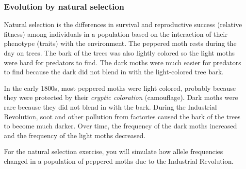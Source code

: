 \documentclass[12pt, hidelinks]{exam}
\begin{document}
%  
%  
%
%
\subsubsection*{Evolution by natural selection}\label{sec:natural_selection}

Natural selection is the differences in survival and reproductive success (relative fitness) among individuals in a population based on the interaction of their phenotype (traits) with the environment. The peppered moth rests during the day on trees. The bark of the trees was also lightly colored so the light moths were hard for predators to find. The dark moths were much easier for predators to find because the dark did not blend in with the light-colored tree bark. 

In the early 1800s, most peppered moths were light colored, probably because they were protected by their \emph{cryptic coloration} (camouflage). Dark moths were rare because they did not blend in with the bark. During the Industrial Revolution, soot and other pollution from factories caused the bark of the trees to become much darker. Over time, the frequency of the dark moths increased and the frequency of the light moths decreased. 

For the natural selection exercise, you will simulate how allele frequencies changed in a population of peppered moths due to the Industrial Revolution. 
\end{document}
